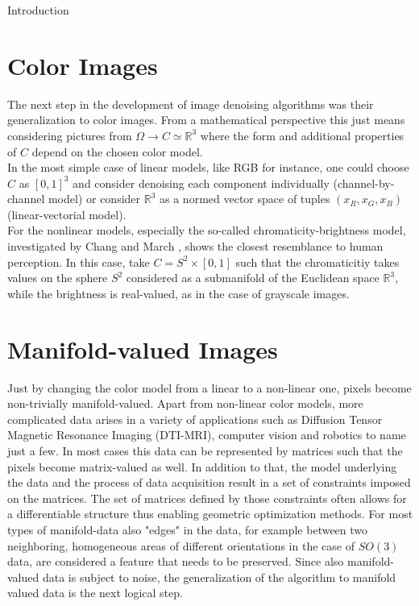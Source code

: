 \begin{chapter}{Introduction}


\section{Color Images}
The next step in the development of image denoising algorithms was their generalization to color images. From a mathematical perspective this just means considering pictures
from $\Omega\to C\simeq \mathbb{R}^3$ where the form and additional properties of $C$ depend on the chosen color model. \\
In the most simple case of linear models, like RGB for instance, one could choose $C$ as $[0,1]^3$ and consider denoising each component individually (channel-by-channel model)
or consider $\mathbb{R}^3$ as a normed vector space of tuples $(x_R, x_G, x_B)$ (linear-vectorial model).\\
For the nonlinear models, especially the so-called chromaticity-brightness model, investigated by Chang and March \cite{Kang}, shows the closest resemblance to human perception.
In this case, take $C=S^2\times [0,1]$ such that the chromaticitiy takes values on the sphere $S^2$ considered as a submanifold of the Euclidean space $\mathbb{R}^3$, 
while the brightness is real-valued, as in the case of grayscale images.

\section{Manifold-valued Images} %
\label{sec:Manifold-valued Images}
Just by changing the color model from a linear to a non-linear one, pixels become non-trivially manifold-valued.
Apart from non-linear color models, more complicated data arises in a variety of applications such as Diffusion Tensor Magnetic Resonance Imaging (DTI-MRI), computer vision and robotics to name just a few. In most cases this data can
be represented by matrices such that the pixels become matrix-valued as well. In addition to that, the model underlying
the data and the process of data acquisition result in a set of constraints imposed on the matrices. The set of matrices
defined by those constraints often allows for a differentiable structure thus enabling geometric optimization methods.
For most types of manifold-data also "edges" in the data, for example between two neighboring, homogeneous areas of 
different orientations in the case of $SO(3)$ data, are considered a feature that needs to be preserved.
Since also manifold-valued data is subject to noise, the generalization of the algorithm to manifold valued data is the
next logical step.



\end{chapter}

